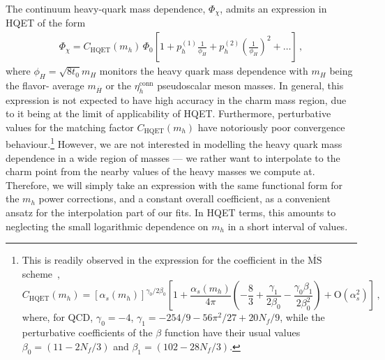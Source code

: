The continuum heavy-quark mass dependence, $\Phi_\chi$, admits an expression in HQET of the form
\begin{align}
	\Phi_{\chi} = C_{\mathrm{HQET}}(m_h)\, \Phi_0 \left[ 1 + p_h^{(1)} \frac{1}{\phi_H} + p_h^{(2)} \left( \frac{1}{\phi_H} \right)^2 + \dots \right]
	\,,
	\label{eq:phichi}
\end{align}
where $\phi_H=\sqrt{8t_0}m_H$ monitors the heavy quark mass dependence with $m_H$ being the flavor-
average $m_{\overline{H}}$ or the $\eta_h^{\mathrm{conn}}$ pseudoscalar meson masses.
In general, this expression is not expected to have high accuracy in the charm mass region,
due to it being at the limit of applicability of HQET. Furthermore, perturbative values
for the matching factor $C_{\mathrm{HQET}}(m_h)$ have notoriously poor convergence behaviour.\footnote{This
is readily observed in the expression for the coefficient in the $\overline{\textrm{MS}}$ scheme~\cite{Manohar:2000dt,
	Ji:1991pr},  
\begin{equation} %
	C_{\mathrm{HQET}}(m_h) = \left[\alpha_s(m_h)\right]^{{\gamma_0}/{2\beta_0}} \left[1 + \frac{\alpha_s(m_h)}{4\pi}
	\left(-\frac{8}{3} + \frac{\gamma_1}{2\beta_0} - \frac{\gamma_0\beta_1}{2\beta_0^2} \right) + {\mathrm{O}}(\alpha_s^2) \right]\,,
	\label{eq:Wilson-coefficient}
\end{equation}
where, for QCD, $\gamma_0 = -4$, $\gamma_1 = -254/9 - 56\pi^2/27 + 20 N_f/9$, while
the perturbative coefficients of the $\beta$ function have their usual values
$\beta_0 = (11 - 2N_f/3)$ and $\beta_1 = (102 - 28N_f/3)$.
}
However, we are not interested in modelling the heavy quark mass dependence in a wide
region of masses --- we rather want to interpolate to the charm point from the nearby values
of the heavy masses we compute at. Therefore, we will simply take an expression with
the same functional form for the $m_h$ power corrections, and a constant overall coefficient,
as a convenient ansatz for the interpolation part of our fits. In HQET terms, this amounts
to neglecting the small logarithmic dependence on $m_h$ in a short interval of values.

